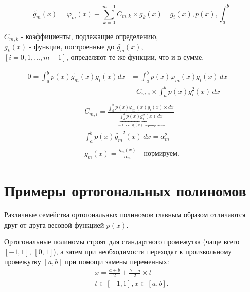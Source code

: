 \documentclass[a4paper,11pt]{article}
\begin{document}
\begin{importantblock}
  \begin{equation*}
    \widetilde{g_m}(x) = \varphi_m(x) - \sum_{k=0}^{m-1}C_{m,k} \times g_k(x) \hspace{10pt} \bigg| g_i(x), p(x), \int_a^b
  \end{equation*}
  \begin{flushright}
    \footnotesize
    $C_{m,k}$ - коэффициенты, подлежащие определению, \\
    $g_k(x)$ - функции, построенные до $\widetilde{g_m}(x)$, \\
    $[i=0,1,\dots,m-1]$, определяют те же функции, что и в сумме.
  \end{flushright}
  \begin{align*}
    0 =  \int_a^b p(x)\widetilde{g_m}(x)g_i(x)dx &= \int_a^b p(x)\varphi_m(x)g_i(x)\, dx -\\
    &- C_{m,i} \times \int_a^b p(x)g_i^2(x)\, dx \\
  \end{align*}
  \begin{gather*}
    C_{m,i} = \frac{\int_a^b p(x)\varphi_m(x)g_i(x) \times dx}{\underbrace{\int_a^b p(x)g_i^2(x)\, dx}_{=1\text{, т.к. $g_i(x)$ нормированы}}} \\
    \int_a^b p(x)\widetilde{g_m}^2(x)\, dx = \alpha_m^2 \\
    g_m(x) = \frac{\widetilde{g_m}(x)}{\alpha_m} \textit{ - нормируем}.
  \end{gather*}
\end{importantblock}

\section{Примеры ортогональных полиномов}
Различные семейства ортогональных полиномов главным образом отличаются друг от друга весовой функцией $p(x)$.
\begin{mainblock}
  Ортогональные полиномы строят для стандартного промежутка (чаще всего $[-1, 1],\, [0, 1]$), а затем при необходимости
  переходят к произвольному промежутку $[a,b]$ при помощи замены переменных:
  \begin{gather*}
    \boxed{x = \frac{a+b}{2}+\frac{b-a}{2} \times t} \\
    t \in [-1,1], x \in [a,b].
  \end{gather*}
\end{mainblock}
\end{document}
